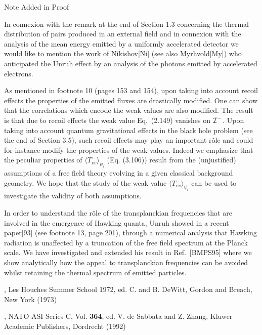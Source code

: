 \documentclass[12pt,oneside]{report}
\begin{document}
{%


{\huge Note Added in Proof}


In connexion with the remark at the end of Section 1.3 concerning the thermal
distribution of pairs produced in an external field and in connexion with the analysis of
the mean energy emitted by a uniformly accelerated detector we would like to mention the
work of Nikishov[Ni] (see also Myrhvold[My]) who anticipated the Unruh effect by an
analysis of the photons emitted by accelerated electrons.

As mentioned in footnote 10 (pages 153 and 154), upon taking into account recoil effects
the properties of the emitted fluxes are drastically modified. One can show that the
correlations which encode the weak values are also modified. The result is that due to
recoil effects the weak value Eq.~(2.149) vanishes on ${\cal I}^-$. Upon taking into
account quantum gravitational effects in the black hole problem (see the end of Section
3.5), such recoil effects may play an important r{\^o}le and could for instance modify
the properties of the weak values. Indeed we emphasize that the peculiar properties of
$\langle T_{vv} \rangle_{\psi_i}$ (Eq. (3.106)) result from the (unjustified) assumptions
of a free field theory evolving in a given classical background geometry. We hope 
that the study of the weak value $\langle T_{vv} \rangle_{\psi_i}$  can be used to
investigate the validity of both assumptions.

In order to understand the r{\^o}le of the transplanckian frequencies that are involved
in the emergence of Hawking quanta, Unruh showed in a recent paper[93] (see footnote
13, page 201), through a numerical analysis that Hawking radiation is unaffected by a
truncation of the free field spectrum at the Planck scale. We have investigated and
extended his result in Ref.~[BMPS95] where we show analytically how the appeal to
transplanckian frequencies can be avoided whilst retaining the thermal spectrum of emitted
particles.




\begin{thebibliography}{999}


, Les Houches Summer School 1972, ed. C. and
B. DeWitt, Gordon and Breach, New York (1973)

, NATO ASI Series C, Vol. {\bf 364}, ed. V. de
Sabbata and Z. Zhang, Kluwer Academic Publishers, Dordrecht (1992)


\end{thebibliography}}
\end{document}
